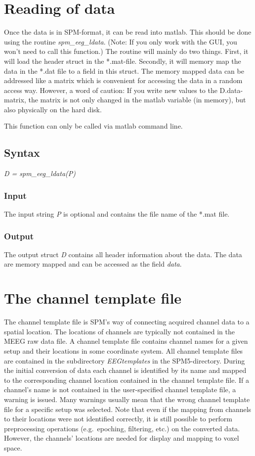 \section{Reading of data}
\label{sec:ldata}
Once the data is in SPM-format, it can be read into matlab. This should
be done using the routine {\it spm\_eeg\_ldata}. (Note: If you only
work with the GUI, you won't need to call this function.) The
routine will mainly do two things. First, it will load the header struct in the
*.mat-file. Secondly, it will memory map the data in the *.dat file to
a field in this struct. The memory mapped data can be addressed like a
matrix which is convenient for accessing the data in a random access
way. However, a word of caution: If you write new values to the
D.data-matrix, the matrix is not only changed in the matlab variable
(in memory), but also physically on the hard disk. 

This function can only be called via matlab command line.

\subsection{Syntax}
\textit{D = spm\_eeg\_ldata(P)}
\\

\subsubsection{Input}
The input string {\it P} is optional and contains the file name of the
*.mat file.

\subsubsection{Output}
The output struct {\it D} contains all header information about the
data. The data are memory mapped and can be accessed as the field {\it data}.

\section{The channel template file}
\label{sec:ctf}
The channel template file is SPM's way of connecting acquired channel
data to a spatial location. The locations of channels are typically not
contained in the MEEG raw data file. A channel template
file contains channel names for a given setup and their locations in
some coordinate system. All channel template files are contained in
the subdirectory {\it EEGtemplates} in the SPM5-directory.
During the initial conversion of data each channel is
identified by its name and mapped to the corresponding channel
location contained in the channel template file. If a channel's name
is not contained in the user-specified channel template file, a
warning is issued. Many warnings usually mean that the wrong channel
template file for a specific setup was selected. Note that
even if the mapping from channels to their locations were not
identified correctly, it is still possible to perform preprocessing
operations (e.g.~epoching, filtering, etc.) on the converted
data. However, the channels' locations are needed for display and
mapping to voxel space. 

